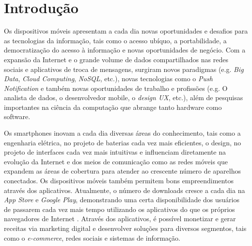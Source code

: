 \section{Introdução}\label{sec:introducao}
Os dispositivos móveis apresentam a cada dia novas oportunidades e desafios para as tecnologias da informação, tais como o acesso ubíquo, a portabilidade, a democratização do acesso à informação e novas oportunidades de negócio. Com a expansão da Internet e o grande volume de dados compartilhados nas redes sociais e aplicativos de troca de mensagens, surgiram novos paradigmas (e.g. \textit{Big Data}, \textit{Cloud Computing}, \textit{NoSQL}, etc.), novas tecnologias como o \textit{Push Notification} e também novas oportunidades de trabalho e profissões (e.g. O analista de dados, o desenvolvedor mobile, o \textit{design UX}, etc.), além de pesquisas importantes na ciência da computação que abrange tanto hardware como software.\par

Os smartphones inovam a cada dia diversas áreas do conhecimento, tais como a engenharia elétrica, no projeto de baterias cada vez mais eficientes, o design, no projeto de interfaces cada vez mais intuitivas e influenciam diretamente na evolução da Internet e dos meios de comunicação como as redes móveis que expandem as áreas de cobertura para atender ao crescente número de aparelhos conectados. Os dispositivos móveis também permitem bons empreendimentos através dos aplicativos. Atualmente, o número de downloads cresce a cada dia na \textit{App Store} e \textit{Google Play}, demonstrando uma certa disponibilidade dos usuários de passarem cada vez mais tempo utilizando os aplicativos do que os próprios navegadores de Internet \cite{D&T}. Através dos aplicativos, é possível monetizar e gerar receitas via marketing digital e desenvolver soluções para diversos segmentos, tais como o \textit{e-commerce}, redes sociais e sistemas de informação.\par


